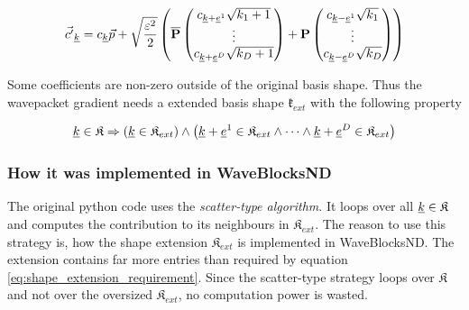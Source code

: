 \documentclass{article}
\begin{document}
\begin{equation}
  \label{eq:compute_grad_coeff}
  \vec{c'}_{\underline{k}}=c_{\underline{k}}\vec{p}+\sqrt{\frac{\varepsilon^2}{2}}
  \left(\mathbf{\overline{P}}
    \begin{pmatrix}
      c_{\underline{k}+\underline{e}^1}\sqrt{k_1+1} \\
      \vdots \\
      c_{\underline{k}+\underline{e}^D}\sqrt{k_D+1} \\
    \end{pmatrix}
    +\mathbf{P}
    \begin{pmatrix}
      c_{\underline{k}-\underline{e}^1}\sqrt{k_1} \\
      \vdots \\
      c_{\underline{k}-\underline{e}^D}\sqrt{k_D} \\
    \end{pmatrix}
  \right)
\end{equation}

Some coefficients are non-zero outside of the original basis shape.
Thus the wavepacket gradient needs a extended basis shape \(\mathfrak{k}_{ext}\)
with the following property

\begin{equation}
  \label{eq:shape_extension_requirement}
  \underline{k} \in \mathfrak{K} \Rightarrow
  \left(
     \underline{k} \in \mathfrak{K}_{ext}
  \right)
  \wedge
  \left(
    \underline{k}+\underline{e}^1 \in \mathfrak{K}_{ext}
    \wedge \dots \wedge
    \underline{k}+\underline{e}^D \in \mathfrak{K}_{ext}
  \right)
\end{equation}

\subsubsection{How it was implemented in WaveBlocksND}
The original python code uses the \emph{scatter-type algorithm}.
It loops over all \(\underline{k} \in \mathfrak{K}\) and computes the contribution
to its neighbours in \(\mathfrak{K}_{ext}\). The reason to use this strategy is,
how the shape extension \(\mathfrak{K}_{ext}\) is implemented in WaveBlocksND.
The extension contains far more entries than required by equation
\eqref{eq:shape_extension_requirement}.
Since the scatter-type strategy loops over \(\mathfrak{K}\) and
not over the oversized \(\mathfrak{K}_{ext}\), no computation power is wasted.
\end{document}

